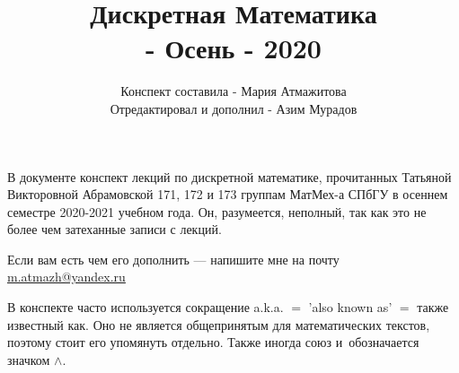 \documentclass[a4paper,oneside,11pt,openany]{book}
\title{
    Дискретная Математика\\
    [1ex]
    \largeСеместр 1 - Осень - 2020
}
\author{
    Конспект составила - Мария Атмажитова\\
    Отредактировал и дополнил - Азим Мурадов
}
\begin{document}
    \maketitle

    В документе конспект лекций по дискретной математике, прочитанных Татьяной Викторовной Абрамовской 171, 172 и 173 группам МатМех-а СПбГУ в осеннем семестре 2020-2021 учебном года.
    Он, разумеется, неполный, так как это не более чем затеханные записи с лекций.

    Если вам есть чем его дополнить — напишите мне на почту \href{mailto:m.atmazh@yandex.ru}{m.atmazh@yandex.ru}

    В конспекте часто используется сокращение a.k.a. $=$ 'also known as' $=$ \guillemotleft также известный как\guillemotright.
    Оно не является общепринятым для математических текстов, поэтому стоит его упомянуть отдельно.
    Также иногда союз \guillemotleft и\guillemotright ~обозначается значком $\wedge$.

    \tableofcontents


\end{document}
